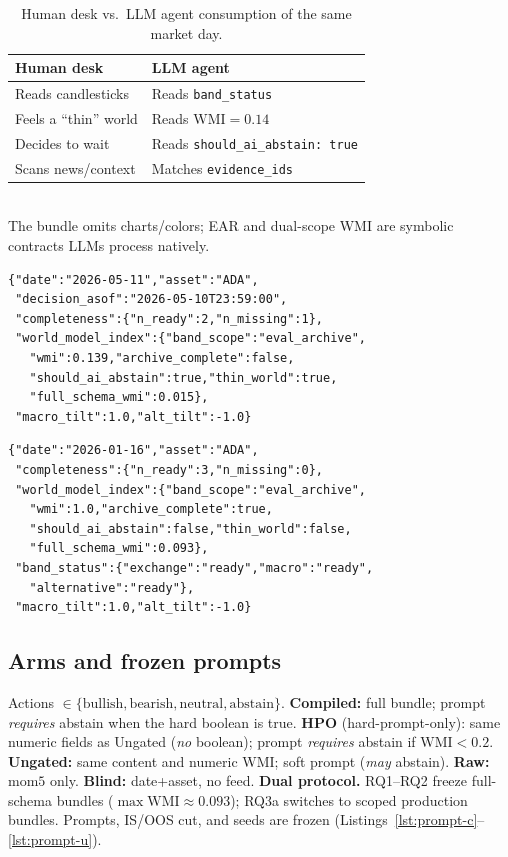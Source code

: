 \documentclass[sigconf,anonymous]{acmart}
\theoremstyle{acmdefinition}%
\theoremstyle{acmplain}%
\begin{document}
\begin{table}[H]
  \caption{Human desk vs.\ LLM agent consumption of the same market day.}
  \label{tab:humanllm}
  \small
  \begin{tabular}{@{}ll@{}}
    \toprule
    Human desk & LLM agent \\
    \midrule
    Reads candlesticks & Reads \texttt{band\_status} \\
    Feels a ``thin'' world & Reads \(\mathrm{WMI}{=}0.14\) \\
    Decides to wait & Reads \texttt{should\_ai\_abstain: true} \\
    Scans news/context & Matches \texttt{evidence\_ids} \\
    \bottomrule
  \end{tabular}\\[-2pt]
  {\scriptsize The bundle omits charts/colors; EAR and dual-scope WMI are symbolic contracts LLMs process natively.}
\end{table}

\begin{lstlisting}[caption={Exchange-gap bundle (Compiled; scoped closed).},label={lst:bundle}]
{"date":"2026-05-11","asset":"ADA",
 "decision_asof":"2026-05-10T23:59:00",
 "completeness":{"n_ready":2,"n_missing":1},
 "world_model_index":{"band_scope":"eval_archive",
   "wmi":0.139,"archive_complete":false,
   "should_ai_abstain":true,"thin_world":true,
   "full_schema_wmi":0.015},
 "macro_tilt":1.0,"alt_tilt":-1.0}
\end{lstlisting}

\begin{lstlisting}[caption={$3/3$-ready day: scoped valve opens.},label={lst:bundle-thick}]
{"date":"2026-01-16","asset":"ADA",
 "completeness":{"n_ready":3,"n_missing":0},
 "world_model_index":{"band_scope":"eval_archive",
   "wmi":1.0,"archive_complete":true,
   "should_ai_abstain":false,"thin_world":false,
   "full_schema_wmi":0.093},
 "band_status":{"exchange":"ready","macro":"ready",
   "alternative":"ready"},
 "macro_tilt":1.0,"alt_tilt":-1.0}
\end{lstlisting}

\subsection{Arms and frozen prompts}
Actions \(\in\{\mathrm{bullish},\mathrm{bearish},\mathrm{neutral},\mathrm{abstain}\}\).
\textbf{Compiled:} full bundle; prompt \emph{requires} abstain when the hard boolean is true.
\textbf{HPO} (hard-prompt-only): same numeric fields as Ungated (\emph{no} boolean); prompt \emph{requires} abstain if \(\mathrm{WMI}<0.2\).
\textbf{Ungated:} same content and numeric WMI; soft prompt (\emph{may} abstain).
\textbf{Raw:} \(\mathrm{mom5}\) only.
\textbf{Blind:} date+asset, no feed.
\textbf{Dual protocol.} RQ1--RQ2 freeze full-schema bundles (\(\max\mathrm{WMI}\approx 0.093\)); RQ3a switches to scoped production bundles.
Prompts, IS/OOS cut, and seeds are frozen (Listings~\ref{lst:prompt-c}--\ref{lst:prompt-u}).
\end{document}
